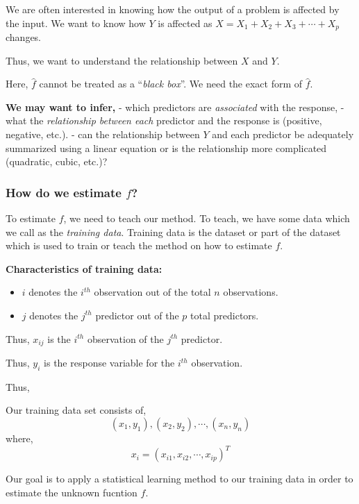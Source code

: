 \documentclass[11pt]{article}
\providecommand{\tightlist}{%
      \setlength{\itemsep}{0pt}\setlength{\parskip}{0pt}}
\begin{document}
We are often interested in knowing how the output of a problem is
affected by the input. We want to know how \(Y\) is affected as
\(X = X_{1} + X_{2} + X_{3} + \cdots + X_{p}\) changes.

Thus, we want to understand the relationship between \(X\) and \(Y\).

Here, \(\hat{f}\) cannot be treated as a ``\emph{black box}''. We need
the exact form of \(\hat{f}\).

\textbf{We may want to infer,} - which predictors are \emph{associated}
with the response, - what the \emph{relationship between each} predictor
and the response is (positive, negative, etc.). - can the relationship
between \(Y\) and each predictor be adequately summarized using a linear
equation or is the relationship more complicated (quadratic, cubic,
etc.)?

    \hypertarget{how-do-we-estimate-f}{%
\subsubsection{\texorpdfstring{How do we estimate
\(f\)?}{How do we estimate f?}}\label{how-do-we-estimate-f}}

To estimate \(f\), we need to teach our method. To teach, we have some
data which we call as the \emph{training data}. Training data is the
dataset or part of the dataset which is used to train or teach the
method on how to estimate \(f\).

\textbf{Characteristics of training data:}

\begin{itemize}
\tightlist
\item
  \(i\) denotes the \(i^{th}\) observation out of the total \(n\)
  observations.
\item
  \(j\) denotes the \(j^{th}\) predictor out of the \(p\) total
  predictors.
\end{itemize}

Thus, \(x_{ij}\) is the \(i^{th}\) observation of the \(j^{th}\)
predictor.

Thus, \(y_{i}\) is the response variable for the \(i^{th}\) observation.

Thus,

Our training data set consists of, \[
{(x_{1}, y_{1}), (x_{2}, y_{2}), \cdots, (x_{n}, y_{n})}
\] where, \[
x_{i} = (x_{i1}, x_{i2}, \cdots, x_{ip})^{T}
\]

Our goal is to apply a statistical learning method to our training data
in order to estimate the unknown fucntion \(f\).
\end{document}
